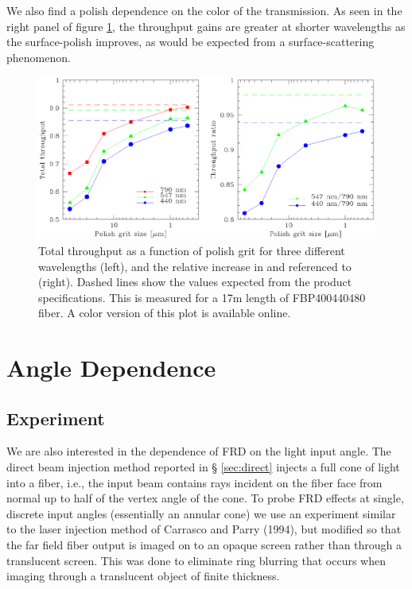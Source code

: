 We also find a polish dependence on the color of the transmission.  As
seen in the right panel of figure \ref{fig:tputwave}, the throughput
gains are greater at shorter wavelengths as the surface-polish
improves, as would be expected from a surface-scattering phenomenon.

\begin{figure}[ht]
  \centering
  \includegraphics[width=\textwidth, trim=0 4in 0 0, clip=true]{FRD/figs/tput.eps}
  \caption{\label{fig:tputwave} Total throughput as a function of
    polish grit for three different wavelengths (left), and the relative
    increase in \filtB and \filty referenced to \filtI (right). Dashed
    lines show the values expected from the product
    specifications. This is measured for a 17m length of FBP400440480
    fiber. A color version of this plot is available online.}
\end{figure}

\section{Angle Dependence}
\label{sec:angle}
\subsection{Experiment}
We are also interested in the dependence of FRD on the light input
angle. The direct beam injection method reported in \S
\ref{sec:direct} injects a full cone of light into a fiber, i.e., 
the input beam contains rays incident on the fiber face from normal up
to half of the vertex angle of the cone.  To probe FRD effects at
single, discrete input angles (essentially an annular cone) we use an
experiment similar to the laser injection method of Carrasco and
Parry (1994)\cite{Carrasco, Haynes11}, but modified so that the far
field fiber output is imaged on to an opaque screen rather than through a
translucent screen. This was done to eliminate ring blurring that
occurs when imaging through a translucent object of finite thickness.

